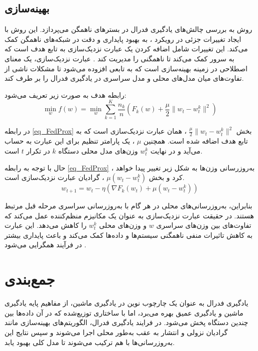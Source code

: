 \subsection{
بهینه‌سازی
}
روش
به بررسی چالش‌های یادگیری فدرال در بسترهای ناهمگن می‌پردازد. این روش با ایجاد تغییرات جزئی در رویکرد
%
، به بهبود پایداری و دقت در شبکه‌های ناهمگن کمک می‌کند. این تغییرات شامل اضافه کردن یک عبارت نزدیک‌سازی%
به تابع هدف است که به سرور کمک می‌کند تا ناهمگنی را مدیریت کند
\cite{li2020federatedheteroneneous}.
عبارت نزدیک‌سازی، یک معنای اصطلاحی در زمینه بهینه‌سازی است که به تابعی افزوده می‌شود تا مشکلات ناشی از تفاوت‌های میان مدل‌های محلی و مدل سراسری در یادگیری فدرال را بر طرف کند. 

رابطه هدف
به صورت زیر تعریف می‌شود:
\begin{equation}
\min_{w} f(w) = \min_{w} \sum_{k=1}^{K} \frac{n_k}{n} \left( F_k(w) + \frac{\mu}{2} \|w_t - w_t^k\|^2 \right)
\label{eq_FedProx}
\end{equation}

در رابطه
\eqref{eq_FedProx}
بخش
$\frac{\mu}{2} \|w_t - w_t^k\|^2$%
، همان عبارت نزدیک‌سازی است که به تابع هدف اضافه شده است. همچنین
$\mu$%
، یک پارامتر تنظیم برای این عبارت به حساب می‌آید و در نهایت
$w_t^k$
وزن‌های مدل محلی دستگاه
$k$
در تکرار
$t$
است.

حال با توجه به رابطه
\eqref{eq_FedProx}%
، به‌روزرسانی وزن‌ها به شکل زیر تغییر پیدا خواهد کرد و بخش
$\mu (w_t - w_t^k)$%
، گرادیان عبارت نزدیک‌‌سازی است.
\begin{equation}
w_{t+1} = w_t - \eta (\nabla F_k(w_t) + \mu (w_t - w_t^k))
\end{equation}

بنابراین، به‌روزرسانی‌های محلی در هر گام با به‌روزرسانی سراسری مرحله قبل مرتبط هستند. در حقیقت عبارت نزدیک‌سازی به عنوان یک مکانیزم منظم‌کننده%
عمل می‌کند که تفاوت‌های بین وزن‌های سراسری
$w$
و وزن‌های محلی
$w_t^k$
را کاهش می‌دهد. این عبارت به کاهش تاثیرات منفی ناهمگنی سیستم‌ها و داده‌ها کمک می‌کند و باعث پایداری بیشتر در فرآیند همگرایی می‌شود
\cite{li2020federatedheteroneneous}.


\section{جمع‌بندی}
یادگیری فدرال به عنوان یک چارچوب نوین در یادگیری ماشین، از مفاهیم پایه یادگیری ماشین و یادگیری عمیق بهره می‌برد، اما با ساختاری توزیع‌شده که در آن داده‌ها بین چندین دستگاه پخش می‌شود. در فرایند یادگیری فدرال، الگوریتم‌های بهینه‌سازی مانند گرادیان نزولی و انتشار به عقب به‌طور محلی اجرا می‌شوند و سپس نتایج این به‌روزرسانی‌ها با هم ترکیب می‌شوند تا مدل کلی بهبود یابد.

